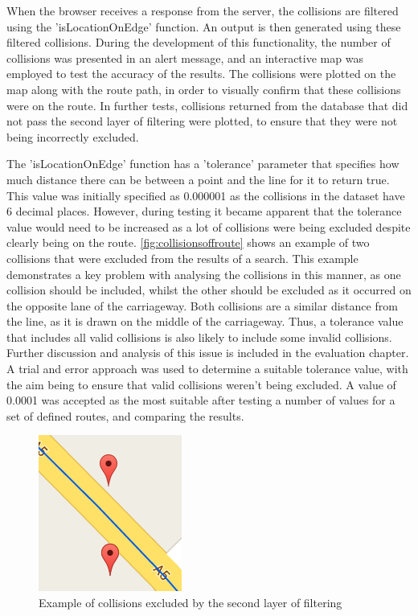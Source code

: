 \documentclass[authoryearcitations]{UoYCSproject}
\begin{document}
When the browser receives a response from the server, the collisions are filtered using the 'isLocationOnEdge' function. An output is then generated using these filtered collisions. During the development of this functionality, the number of collisions was presented in an alert message, and an interactive map was employed to test the accuracy of the results. The collisions were plotted on the map along with the route path, in order to visually confirm that these collisions were on the route. In further tests, collisions returned from the database that did not pass the second layer of filtering were plotted, to ensure that they were not being incorrectly excluded. 

The 'isLocationOnEdge' function has a 'tolerance' parameter that specifies how much distance there can be between a point and the line for it to return true. This value was initially specified as 0.000001 as the collisions in the dataset have 6 decimal places. However, during testing it became apparent that the tolerance value would need to be increased as a lot of collisions were being excluded despite clearly being on the route. \autoref{fig:collisionsoffroute} shows an example of two collisions that were excluded from the results of a search. This example demonstrates a key problem with analysing the collisions in this manner, as one collision should be included, whilst the other should be excluded as it occurred on the opposite lane of the carriageway. Both collisions are a similar distance from the line, as it is drawn on the middle of the carriageway. Thus, a tolerance value that includes all valid collisions is also likely to include some invalid collisions. Further discussion and analysis of this issue is included in the evaluation chapter. A trial and error approach was used to determine a suitable tolerance value, with the aim being to ensure that valid collisions weren't being excluded. A value of 0.0001 was accepted as the most suitable after testing a number of values for a set of defined routes, and comparing the results.

\begin{figure}
	\center
	\includegraphics[scale=0.8]{collisionoffroute}
	\caption{Example of collisions excluded by the second layer of filtering}
	\label{fig:collisionsoffroute}
\end{figure}
\end{document}
